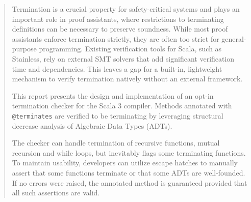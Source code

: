 \begin{abstract}

Termination is a crucial property for safety-critical systems and plays an
important role in proof assistants, where restrictions to terminating
definitions can be necessary to preserve soundness.
While most proof assistants enforce termination strictly, they are often too
strict for general-purpose programming. Existing verification tools for Scala,
such as Stainless, rely on external SMT solvers that add significant
verification time and dependencies. This leaves a gap for a built-in,
lightweight mechanism to verify termination natively without an external
framework.

This report presents the design and implementation of an opt-in termination
checker for the Scala 3 compiler.
Methods annotated with \texttt{@terminates} are verified to be terminating by 
leveraging structural decrease analysis of Algebraic Data Types (ADTs).

The checker can handle termination of recursive functions, mutual recursion
and while loops, but inevitably flags some terminating functions. 
To maintain usability, developers can utilize escape hatches to manually
assert that some functions terminate or that some ADTs are well-founded.
If no errors were raised, the annotated method is guaranteed provided that
all such assertions are valid.

\end{abstract}

